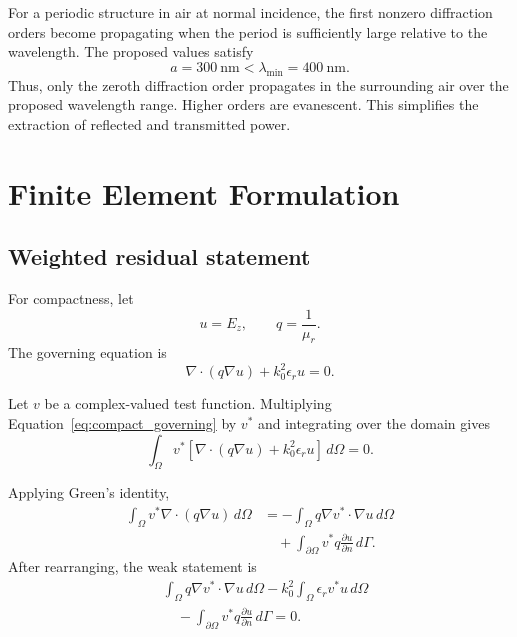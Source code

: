 \documentclass{article}
\begin{document}
For a periodic structure in air at normal incidence, the first
nonzero diffraction orders become propagating when the period is
sufficiently large relative to the wavelength. The proposed values
satisfy
\begin{equation}
    a=\SI{300}{\nano\meter}
    < \lambda_{\min}=\SI{400}{\nano\meter}.
\end{equation}
Thus, only the zeroth diffraction order propagates in the surrounding
air over the proposed wavelength range. Higher orders are evanescent.
This simplifies the extraction of reflected and transmitted power.

\chapter{Finite Element Formulation}

\section{Weighted residual statement}

For compactness, let
\begin{equation}
    u=E_z,\qquad q=\frac{1}{\mu_r}.
\end{equation}
The governing equation is
\begin{equation}
    \nabla\cdot(q\nabla u)+k_0^2\epsilon_ru=0.
    \label{eq:compact_governing}
\end{equation}

Let $v$ be a complex-valued test function. Multiplying
Equation~\eqref{eq:compact_governing} by $v^*$ and integrating over
the domain gives
\begin{equation}
    \int_\Omega v^*
    \left[\nabla\cdot(q\nabla u)+k_0^2\epsilon_ru\right]
    \,d\Omega=0.
\end{equation}

Applying Green's identity,
\begin{align}
    \int_\Omega v^*\nabla\cdot(q\nabla u)\,d\Omega
    &=
    -\int_\Omega q\nabla v^*\cdot\nabla u\,d\Omega
    \nonumber\\
    &\quad+
    \int_{\partial\Omega}v^*q
    \frac{\partial u}{\partial n}\,d\Gamma.
\end{align}
After rearranging, the weak statement is
\begin{align}
    &\int_\Omega q\nabla v^*\cdot\nabla u\,d\Omega
    -k_0^2\int_\Omega\epsilon_rv^*u\,d\Omega
    \nonumber\\
    &\quad-
    \int_{\partial\Omega}v^*q
    \frac{\partial u}{\partial n}\,d\Gamma=0.
    \label{eq:weak_before_bc}
\end{align}
\end{document}
